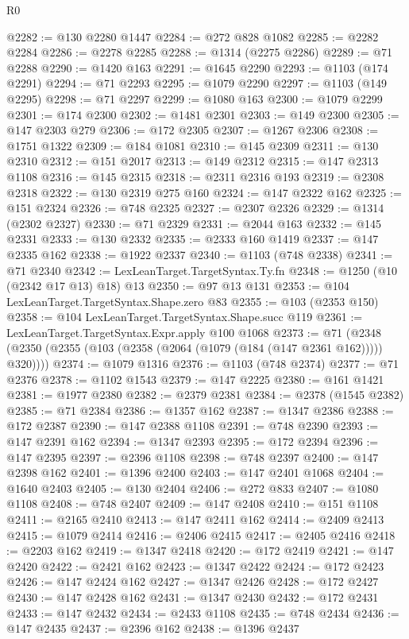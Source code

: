 \begin{lexlean}{R0}
\begin{coremodule}
@2282 := @130 @2280 @1447
@2284 := @272 @828 @1082
@2285 := @2282 @2284
@2286 := @2278 @2285
@2288 := @1314 (@2275 @2286)
@2289 := @71 @2288
@2290 := @1420 @163
@2291 := @1645 @2290
@2293 := @1103 (@174 @2291)
@2294 := @71 @2293
@2295 := @1079 @2290
@2297 := @1103 (@149 @2295)
@2298 := @71 @2297
@2299 := @1080 @163
@2300 := @1079 @2299
@2301 := @174 @2300
@2302 := @1481 @2301
@2303 := @149 @2300
@2305 := @147 @2303 @279
@2306 := @172 @2305
@2307 := @1267 @2306
@2308 := @1751 @1322
@2309 := @184 @1081
@2310 := @145 @2309
@2311 := @130 @2310
@2312 := @151 @2017
@2313 := @149 @2312
@2315 := @147 @2313 @1108
@2316 := @145 @2315
@2318 := @2311 @2316 @193
@2319 := @2308 @2318
@2322 := @130 @2319 @275 @160
@2324 := @147 @2322 @162
@2325 := @151 @2324
@2326 := @748 @2325
@2327 := @2307 @2326
@2329 := @1314 (@2302 @2327)
@2330 := @71 @2329
@2331 := @2044 @163
@2332 := @145 @2331
@2333 := @130 @2332
@2335 := @2333 @160 @1419
@2337 := @147 @2335 @162
@2338 := @1922 @2337
@2340 := @1103 (@748 @2338)
@2341 := @71 @2340
@2342 := LexLeanTarget.TargetSyntax.Ty.fn
@2348 := @1250 (@10 (@2342 @17 @13) @18) @13
@2350 := @97 @13 @131
@2353 := @104 LexLeanTarget.TargetSyntax.Shape.zero @83
@2355 := @103 (@2353 @150)
@2358 := @104 LexLeanTarget.TargetSyntax.Shape.succ @119
@2361 := LexLeanTarget.TargetSyntax.Expr.apply @100 @1068
@2373 := @71 (@2348 (@2350 (@2355 (@103 (@2358 (@2064 (@1079 (@184 (@147 @2361 @162))))) @320))))
@2374 := @1079 @1316
@2376 := @1103 (@748 @2374)
@2377 := @71 @2376
@2378 := @1102 @1543
@2379 := @147 @2225
@2380 := @161 @1421
@2381 := @1977 @2380
@2382 := @2379 @2381
@2384 := @2378 (@1545 @2382)
@2385 := @71 @2384
@2386 := @1357 @162
@2387 := @1347 @2386
@2388 := @172 @2387
@2390 := @147 @2388 @1108
@2391 := @748 @2390
@2393 := @147 @2391 @162
@2394 := @1347 @2393
@2395 := @172 @2394
@2396 := @147 @2395
@2397 := @2396 @1108
@2398 := @748 @2397
@2400 := @147 @2398 @162
@2401 := @1396 @2400
@2403 := @147 @2401 @1068
@2404 := @1640 @2403
@2405 := @130 @2404
@2406 := @272 @833
@2407 := @1080 @1108
@2408 := @748 @2407
@2409 := @147 @2408
@2410 := @151 @1108
@2411 := @2165 @2410
@2413 := @147 @2411 @162
@2414 := @2409 @2413
@2415 := @1079 @2414
@2416 := @2406 @2415
@2417 := @2405 @2416
@2418 := @2203 @162
@2419 := @1347 @2418
@2420 := @172 @2419
@2421 := @147 @2420
@2422 := @2421 @162
@2423 := @1347 @2422
@2424 := @172 @2423
@2426 := @147 @2424 @162
@2427 := @1347 @2426
@2428 := @172 @2427
@2430 := @147 @2428 @162
@2431 := @1347 @2430
@2432 := @172 @2431
@2433 := @147 @2432
@2434 := @2433 @1108
@2435 := @748 @2434
@2436 := @147 @2435
@2437 := @2396 @162
@2438 := @1396 @2437

\end{coremodule}
\end{lexlean}
